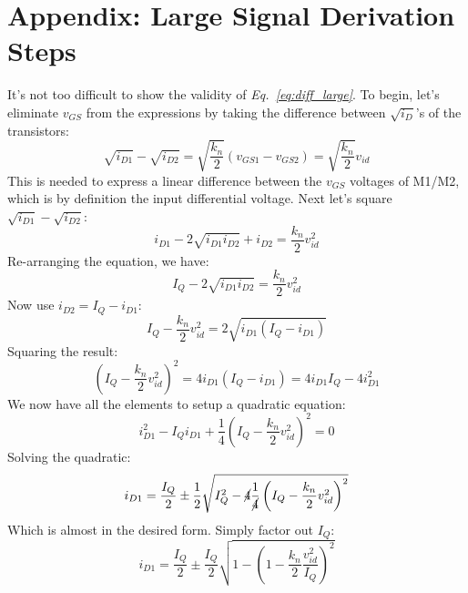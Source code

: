 \section{Appendix: Large Signal Derivation Steps} \label{sec:derive_diff_large}
It's not too difficult to show the validity of \emph{Eq.~\ref{eq:diff_large}}.  To begin, let's eliminate $v_{GS}$ from the expressions by taking the difference between $\sqrt{i_D}$'s of the transistors:
    \begin{equation}
        \sqrt {{i_{D1}}}  - \sqrt {{i_{D2}}}  = \sqrt {\frac{{{k_n}}}{2}} \left( {{v_{GS1}} - {v_{GS2}}} \right) = \sqrt {\frac{{{k_n}}}{2}} {v_{id}} 
    \end{equation}
This is needed to express a linear difference between the $v_{GS}$ voltages of M1/M2, which is by definition the input differential voltage.  Next let's square $\sqrt {{i_{D1}}}  - \sqrt {{i_{D2}}}$:
    \begin{equation}
        i_{D1} - 2 \sqrt{i_{D1} i_{D2}} + i_{D2}  = \frac{k_n}{2} v_{id}^2
    \end{equation}
Re-arranging the equation, we have:
    \begin{equation}
        I_Q - 2 \sqrt{i_{D1} i_{D2}} = \frac{k_n}{2} v_{id}^2
    \end{equation}
Now use ${i_{D2}} = I_Q - {i_{D1}}$:
    \begin{equation}
        I_Q - \frac{k_n}{2} v_{id}^2 = 2 \sqrt{i_{D1} (I_Q - i_{D1})}
    \end{equation}
Squaring the result:
    \begin{equation}
        \left( I_Q - \frac{k_n}{2} v_{id}^2 \right)^2 = 4 i_{D1} (I_Q - i_{D1}) = 4 i_{D1} I_Q - 4 i_{D1}^2
    \end{equation}
We now have all the elements to setup a quadratic equation:
    \begin{equation}
        i_{D1}^2 - I_Q i_{D1} + \frac{1}{4} \left(I_Q - \frac{k_n}{2} v_{id}^2 \right)^2 = 0 
    \end{equation}
Solving the quadratic:
    \begin{equation}
        i_{D1} = \frac{I_Q}{2} \pm \frac{1}{2} \sqrt{I_Q^2 - \cancel{4} \frac{1}{\cancel{4}} \left(I_Q - \frac{k_n}{2} v_{id}^2 \right)^2 }
    \end{equation}
Which is almost in the desired form.  Simply factor out $I_Q$:
    \begin{equation}
        i_{D1} = \frac{I_Q}{2} \pm \frac{I_Q}{2} \sqrt{1 -  \left(1 - \frac{k_n}{2} \frac{v_{id}^2}{I_Q} \right)^2 }
    \end{equation}
